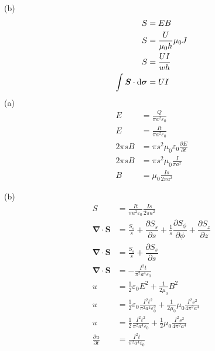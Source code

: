 (b)\begin{align*}
    S&=EB\\
    S&=\frac{U}{\mu_0 h}\mu_0J\\
    S&=\frac{UI}{wh}\\
    \int\boldsymbol{S}\cdot\dif\boldsymbol\sigma&=UI
\end{align*}
(a)
\begin{align*}
    E&=\frac{Q}{\pi a^2\varepsilon_0}\\
    E&=\frac{It}{\pi a^2\varepsilon_0}\\
    2\pi sB&=\pi s^2\mu_0\varepsilon_0\frac{\partial E}{\partial t}\\
    2\pi sB&=\pi s^2\mu_0\frac{I}{\pi a^2}\\
    B&=\mu_0\frac{Is}{2\pi a^2}
\end{align*}

(b)\begin{align*}
    S&=\frac{It}{\pi a^2\varepsilon_0}\frac{Is}{2\pi a^2}\\
    \boldsymbol{\nabla}\cdot\boldsymbol{S}&=\frac{S_s}{s}+\dfrac{\partial S_s}{\partial s}+\frac{1}{s}\dfrac{\partial S_{\phi}}{\partial \phi}+\dfrac{\partial S_{z}}{\partial z}\\
    \boldsymbol{\nabla}\cdot\boldsymbol{S}&=\frac{S_s}{s}+\dfrac{\partial S_s}{\partial s}\\
    \boldsymbol{\nabla}\cdot\boldsymbol{S}&=-\frac{I^2t}{\pi^2 a^4\varepsilon_0}\\
    u&=\frac{1}{2}\varepsilon_0E^2+\frac{1}{2\mu_0}B^2\\
    u&=\frac{1}{2}\varepsilon_0\frac{I^2t^2}{\pi^2 a^4\varepsilon_0^2}+\frac{1}{2\mu_0}\mu_0\frac{I^2s^2}{4\pi^2 a^4}\\
    u&=\frac{1}{2}\frac{I^2t^2}{\pi^2 a^4\varepsilon_0}+\frac{1}{2}\mu_0\frac{I^2s^2}{4\pi^2 a^4}\\
    \frac{\partial u}{\partial t}&=\frac{I^2t}{\pi^2 a^4\varepsilon_0}
\end{align*}
